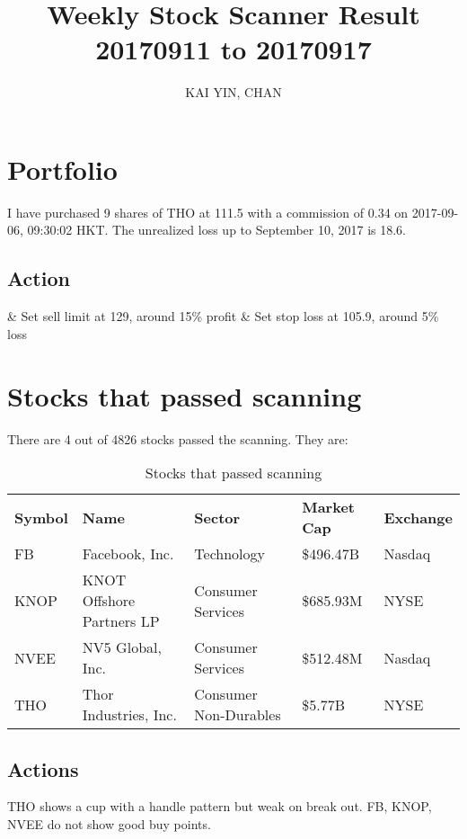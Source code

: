 \documentclass{article}
\begin{document}
\title{Weekly Stock Scanner Result \\ 20170911 to 20170917}
\author{KAI YIN, CHAN}
\maketitle

\section{Portfolio}
I have purchased 9 shares of THO at 111.5 with a commission of 0.34 on 2017-09-06, 09:30:02 HKT. The unrealized loss up to September 10, 2017 is 18.6.

\subsection{Action}
\begin{easylist}
& Set sell limit at 129, around 15\% profit
& Set stop loss at 105.9, around 5\% loss
\end{easylist}

\section{Stocks that passed scanning}

There are 4 out of 4826 stocks passed the scanning.  They are:
\begin{table}[htbp]
  \caption{Stocks that passed scanning}
    \begin{tabular}{lllll}
    \textbf{Symbol} & \textbf{Name} & \textbf{Sector} & \textbf{Market Cap} & \textbf{Exchange} \\
    FB    & Facebook, Inc. & Technology & \$496.47B & Nasdaq \\
    KNOP  & KNOT Offshore Partners LP & Consumer Services & \$685.93M & NYSE \\
    NVEE  & NV5 Global, Inc. & Consumer Services & \$512.48M & Nasdaq \\
    THO   & Thor Industries, Inc. & Consumer Non-Durables & \$5.77B & NYSE \\
    \end{tabular}%
  \label{tab:addlabel}%
\end{table}%

\subsection{Actions}
THO shows a cup with a handle pattern but weak on break out. FB, KNOP, NVEE do not show good buy points.
\end{document}
